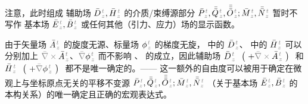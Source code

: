 注意，此时组成 辅助场 $\bar{D}^{\;\!\mathcolor{gray}{t}}_{\;\!\mathcolor{gray}{z}}, \bar{H}^{\;\!\mathcolor{gray}{t}}_{\;\!\mathcolor{gray}{z}}$ 的介质/束缚源部分 $\bar{P}^{\;\!\mathcolor{gray}{t}}_{\;\!\mathcolor{gray}{z}},\bar{\bar{Q}}^{\;\!\mathcolor{gray}{t}}_{\;\!\mathcolor{gray}{z}},\bar{\bar{\bar{O}}}^{\;\!\mathcolor{gray}{t}}_{\;\!\mathcolor{gray}{z}} ; \bar{M}^{\;\!\mathcolor{gray}{t}}_{\;\!\mathcolor{gray}{z}}, \bar{\bar{N}}^{\;\!\mathcolor{gray}{t}}_{\;\!\mathcolor{gray}{z}}$ 暂时不写作 基本场 $\bar{E}^{\;\!\mathcolor{gray}{t}}_{\;\!\mathcolor{gray}{z}}, \bar{B}^{\;\!\mathcolor{gray}{t}}_{\;\!\mathcolor{gray}{z}}$ 或任何其他（引力、应力）场的显示函数。

由于矢量场 $\bar{A}^{\;\!\mathcolor{gray}{t}}_{\;\!\mathcolor{gray}{z}}$ 的旋度无源、标量场 $\phi^{\;\!\mathcolor{gray}{t}}_{\;\!\mathcolor{gray}{z}}$ 的梯度无旋， 中的 $\bar{D}^{\;\!\mathcolor{gray}{t}}_{\;\!\mathcolor{gray}{z}}$、 中的 $\bar{H}^{\;\!\mathcolor{gray}{t}}_{\;\!\mathcolor{gray}{z}}$ 可以分别加上 $\mathcolor{gray}{\bar{\nabla} \times} \bar{A}^{\;\!\mathcolor{gray}{t}}_{\;\!\mathcolor{gray}{z}}$、$\mathcolor{gray}{\bar{\nabla}} \phi^{\;\!\mathcolor{gray}{t}}_{\;\!\mathcolor{gray}{z}}$ 而不影响 、 的成立，因此辅助场 $\bar{D}^{\;\!\mathcolor{gray}{t}}_{\;\!\mathcolor{gray}{z}}$ $~\left(~ + \mathcolor{gray}{\bar{\nabla} \times} \bar{A}^{\;\!\mathcolor{gray}{t}}_{\;\!\mathcolor{gray}{z}} ~\right)~$ 和 $\bar{H}^{\;\!\mathcolor{gray}{t}}_{\;\!\mathcolor{gray}{z}}$ $~\left(~ + \mathcolor{gray}{\bar{\nabla}} \phi^{\;\!\mathcolor{gray}{t}}_{\;\!\mathcolor{gray}{z}} ~\right)~$ 都不是唯一确定的。—— 这一额外的自由度可以被用于确定在微观上与坐标原点无关的平移不变源 $\bar{P}^{\;\!\mathcolor{gray}{t}}_{\;\!\mathcolor{gray}{z}},\bar{\bar{Q}}^{\;\!\mathcolor{gray}{t}}_{\;\!\mathcolor{gray}{z}},\bar{\bar{\bar{O}}}^{\;\!\mathcolor{gray}{t}}_{\;\!\mathcolor{gray}{z}} ; \bar{M}^{\;\!\mathcolor{gray}{t}}_{\;\!\mathcolor{gray}{z}}, \bar{\bar{N}}^{\;\!\mathcolor{gray}{t}}_{\;\!\mathcolor{gray}{z}}$ （关于基本场 $\bar{E}^{\;\!\mathcolor{gray}{t}}_{\;\!\mathcolor{gray}{z}}, \bar{B}^{\;\!\mathcolor{gray}{t}}_{\;\!\mathcolor{gray}{z}}$ 的本构关系）的唯一确定且正确的宏观表达式\cite{welterTranslationallyInvariantSemiclassical2013,delangeTranslationalInvariancePost2012,langeTransitionMicroscopicMacroscopic2012,langeMultipoleTheoryHehl2015,raabCommentOriginDependence2010a,OriginindependentCalculationQuadrupole}。

